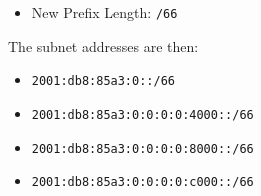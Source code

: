 \documentclass{article}
\begin{document}
\begin{itemize}
    \item New Prefix Length: \texttt{/66}
\end{itemize}

The subnet addresses are then:

\begin{itemize}
    \item \texttt{2001:db8:85a3:0::/66}
    \item \texttt{2001:db8:85a3:0:0:0:0:4000::/66}
    \item \texttt{2001:db8:85a3:0:0:0:0:8000::/66}
    \item \texttt{2001:db8:85a3:0:0:0:0:c000::/66}
\end{itemize}
\end{document}

